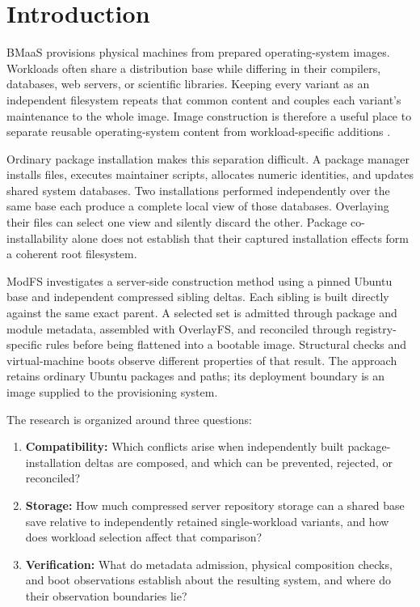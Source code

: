 \chapter{Introduction}
\label{ch:introduction}

\ac{BMaaS} provisions physical machines from prepared operating-system images. Workloads often share a distribution base while differing in their compilers, databases, web servers, or scientific libraries. Keeping every variant as an independent filesystem repeats that common content and couples each variant's maintenance to the whole image. Image construction is therefore a useful place to separate reusable operating-system content from workload-specific additions \autocite{baas,ironic,maas}.

Ordinary package installation makes this separation difficult. A package manager installs files, executes maintainer scripts, allocates numeric identities, and updates shared system databases. Two installations performed independently over the same base each produce a complete local view of those databases. Overlaying their files can select one view and silently discard the other. Package co-installability alone does not establish that their captured installation effects form a coherent root filesystem.

ModFS investigates a server-side construction method using a pinned Ubuntu base and independent compressed sibling deltas. Each sibling is built directly against the same exact parent. A selected set is admitted through package and module metadata, assembled with OverlayFS, and reconciled through registry-specific rules before being flattened into a bootable image. Structural checks and virtual-machine boots observe different properties of that result. The approach retains ordinary Ubuntu packages and paths; its deployment boundary is an image supplied to the provisioning system.

The research is organized around three questions:
\begin{enumerate}
\item \textbf{Compatibility:} Which conflicts arise when independently built package-installation deltas are composed, and which can be prevented, rejected, or reconciled?
\item \textbf{Storage:} How much compressed server repository storage can a shared base save relative to independently retained single-workload variants, and how does workload selection affect that comparison?
\item \textbf{Verification:} What do metadata admission, physical composition checks, and boot observations establish about the resulting system, and where do their observation boundaries lie?
\end{enumerate}

